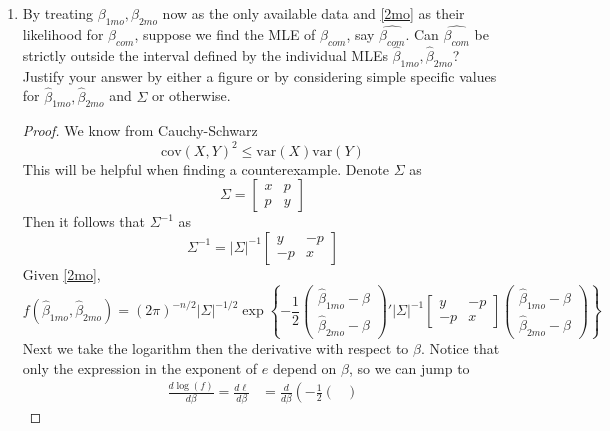 \documentclass[letterpaper, 12pt]{article}
\newcommand{\cov}{\text{cov}}
\newcommand{\var}{\text{var}}
\begin{document}
\begin{enumerate}
\item
By treating 
$\beta_{1mo},\beta_{2mo}$
now as the only available data and \eqref{2mo} as their likelihood for $\beta_{com}$, suppose we find the MLE of $\beta_{com}$, say $\widehat{\beta_{com}}$. Can $\widehat{\beta_{com}}$ be strictly outside the interval defined by the individual MLEs $\hat{\beta}_{1mo},\hat{\beta}_{2mo}$?
Justify your answer by either a figure or by considering simple specific values for $\hat{\beta}_{1mo},\hat{\beta}_{2mo}$ and $\Sigma$ or otherwise.
\begin{proof}
We know from Cauchy-Schwarz
\begin{equation}
\cov(X,Y)^2 \leq \var(X)\var(Y)
\end{equation}
This will be helpful when finding a counterexample. Denote $\Sigma$ as 
\begin{equation}
\Sigma = \begin{bmatrix}
x & p \\ p & y
\end{bmatrix}
\end{equation}
Then it follows that 
$\Sigma^{-1}$ as 
\begin{equation}
\Sigma^{-1} =
|\Sigma|^{-1}
\begin{bmatrix}
y & -p \\
-p & x
\end{bmatrix}
\end{equation}
Given \eqref{2mo},
\begin{equation}
f(\hat{\beta}_{1mo},\hat{\beta}_{2mo}) = 
(2\pi)^{-n/2} |\Sigma|^{-1/2} \exp
\left\{
-\frac{1}{2}
\begin{pmatrix}
\hat{\beta}_{1mo} - \beta
\\
\hat{\beta}_{2mo} - \beta
\end{pmatrix}'
|\Sigma|^{-1}
\begin{bmatrix}
y & -p \\
-p & x
\end{bmatrix}
\begin{pmatrix}
\hat{\beta}_{1mo} - \beta
\\
\hat{\beta}_{2mo} - \beta
\end{pmatrix}
\right\}
\end{equation}
Next we take the logarithm then the derivative with respect to $\beta$. Notice that only the expression in the exponent of $e$ depend on $\beta$, so we can jump to
\begin{align}
\frac{d\log(f)}{d\beta} = 
\frac{d \ell}{d\beta} 
&=
\frac{d}{d\beta}
\left(
-\frac{1}{2}
\begin{pmatrix}

\end{pmatrix}
\end{align}
\end{proof}
\end{enumerate}
\end{document}
